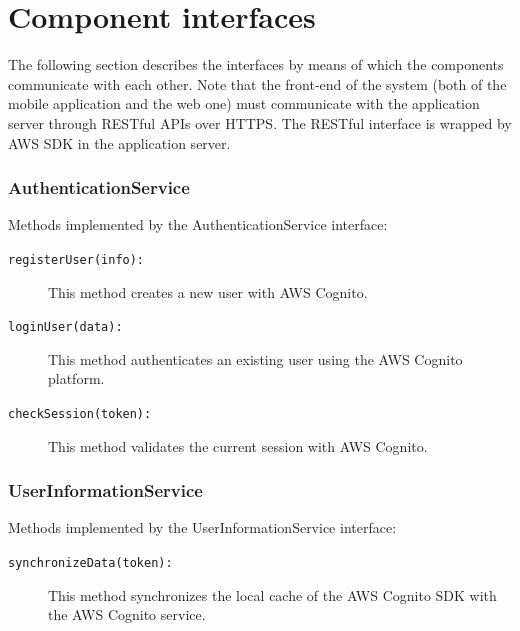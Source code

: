 \vspace*{80px}
\section{Component interfaces}
\label{sec:runtime_view}
The following section describes the interfaces by means of which the components communicate with each other. Note that the front-end of the system (both of the mobile application and the web one) must communicate with the application server through RESTful APIs over HTTPS. The RESTful interface is wrapped by AWS SDK in the application server.

\subsubsection*{AuthenticationService}
Methods implemented by the AuthenticationService interface:
\begin{description}
\item[\texttt{registerUser(info):}] This method creates a new user with AWS Cognito.
\item[\texttt{loginUser(data):}] This method authenticates an existing user using the AWS Cognito platform.
\item[\texttt{checkSession(token):}] This method validates the current session with AWS Cognito.
\end{description}

\subsubsection*{UserInformationService}
Methods implemented by the UserInformationService interface:
\begin{description}
\item[\texttt{synchronizeData(token):}] This method synchronizes the local cache of the AWS Cognito SDK with the AWS Cognito service.
\end{description}

